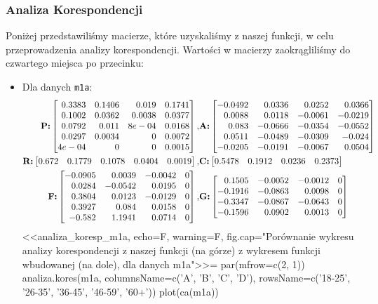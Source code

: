 \documentclass[12pt]{mwart}
\begin{document}
\subsubsection{Analiza Korespondencji}\label{section:3.1.5}
Poniżej przedstawiliśmy macierze, które uzyskaliśmy z naszej funkcji, w celu przeprowadzenia analizy korespondencji. Wartości w macierzy zaokrągliliśmy do czwartego miejsca po przecinku: 
\begin{itemize}[label=$\bullet$]
	\item Dla danych \verb|m1a|:
	\begin{align}
		\text{\textbf{P:}}
\begin{bmatrix*}[r]
	0.3383 & 0.1406 & 0.019 & 0.1741 \\
	0.1002 & 0.0362 & 0.0038 & 0.0377 \\
	0.0792 & 0.011 & 8e-04 & 0.0168 \\
	0.0297 & 0.0034 & 0 & 0.0072 \\
	4e-04 & 0 & 0 & 0.0015
\end{bmatrix*}, &
\text{\textbf{A:}}
\begin{bmatrix*}[r]
	-0.0492 & 0.0336 & 0.0252 & 0.0366 \\
	0.0088 & 0.0118 & -0.0061 & -0.0219 \\
	0.083 & -0.0666 & -0.0354 & -0.0552 \\
	0.0511 & -0.0489 & -0.0309 & -0.024 \\
	-0.0205 & -0.0191 & -0.0067 &  0.0504
\end{bmatrix*}\\
\text{\textbf{R:}}
\begin{bmatrix*}[r]
  0.672 & 0.1779 & 0.1078 & 0.0404 & 0.0019
\end{bmatrix*}, & \text{\textbf{C:}} 
\begin{bmatrix*}[r]
0.5478 & 0.1912 & 0.0236 & 0.2373
\end{bmatrix*}\\
    \text{\textbf{F:}} 
    \begin{bmatrix*}[r]
		 -0.0905 &   0.0039 &  -0.0042 &  0 \\
		 0.0284 &  -0.0542 &   0.0195 &  0 \\
		 0.3804 &   0.0123 &  -0.0129 &  0 \\
		 0.3927 &   0.084 &   0.0158 &  0 \\
		 -0.582 &   1.1941 &  0.0714 &  0
	\end{bmatrix*}, & 
    \text{\textbf{G:}}
  \begin{bmatrix*}[r]
		0.1505 & -0.0052 & -0.0012 & 0 \\
		-0.1916 & -0.0863 &  0.0098 & 0 \\
		-0.3347  & -0.0867 & -0.0643 & 0 \\
		-0.1596 & 0.0902 & 0.0013 & 0
\end{bmatrix*}
\end{align}
  <<analiza_koresp_m1a, echo=F, warning=F, fig.cap="Porównanie wykresu analizy korespondencji z naszej funkcji (na górze) z wykresem funkcji wbudowanej (na dole), dla danych m1a">>=
  par(mfrow=c(2, 1))
	  analiza.kores(m1a, columnsName=c('A', 'B', 'C', 'D'), 
	                rowsName=c('18-25', '26-35', '36-45', '46-59', '60+'))
	  plot(ca(m1a))
	  

\end{itemize}
\end{document}
